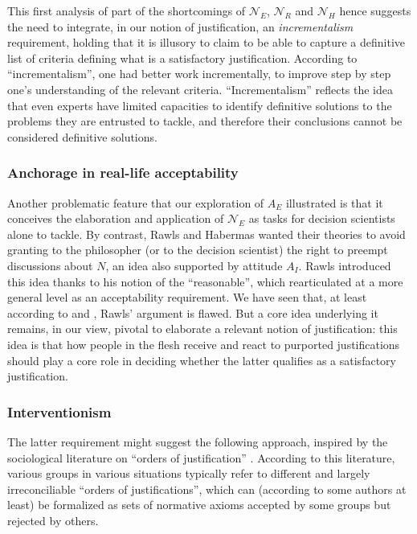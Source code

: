 \documentclass[preprint, french, english, 11pt, authoryear]{elsarticle}%
\begin{document}
This first analysis of part of the shortcomings of $\mathscr{N}_E$, $\mathscr{N}_{R}$ and $\mathscr{N}_{H}$ hence suggests the need to integrate, in our notion of justification, an \emph{incrementalism} requirement, holding that it is illusory to claim to be able to capture a definitive list of criteria defining what is a satisfactory justification. According to “incrementalism”, one had better work incrementally, to improve step by step one's understanding of the relevant criteria. “Incrementalism” reflects the idea that even experts have limited capacities to identify definitive solutions to the problems they are entrusted to tackle, and therefore their conclusions cannot be considered definitive solutions.

\subsubsection{Anchorage in real-life acceptability}
Another problematic feature that our exploration of $A_E$ illustrated is that it conceives the elaboration and application of $\mathscr{N}_E$ as tasks for decision scientists alone to tackle. By contrast, Rawls and Habermas wanted their theories to avoid granting to the philosopher (or to the decision scientist) the right to preempt discussions about $N$, an idea also supported by attitude $A_I$. Rawls introduced this idea thanks to his notion of the ``reasonable'', which \cite{estlund_democratic_2009} rearticulated at a more general level as an acceptability requirement. We have seen that, at least according to \cite{habermas_reconciliation_1995} and \cite{estlund_democratic_2009}, Rawls' argument is flawed. But a core idea underlying it remains, in our view, pivotal to elaborate a relevant notion of justification: this idea is that how people in the flesh receive and react to purported justifications should play a core role in deciding whether the latter qualifies as a satisfactory justification.

\subsubsection{Interventionism}
The latter requirement might suggest the following approach, inspired by the sociological literature on “orders of justification” \citep{boltanski_justification_2006}. According to this literature, various groups in various situations typically refer to different and largely irreconciliable “orders of justifications”, which can (according to some authors at least) be formalized as sets of normative axioms accepted by some groups but rejected by others.
\end{document}
